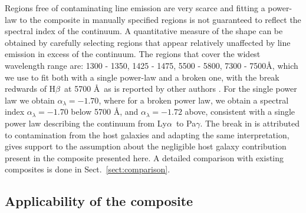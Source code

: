 \documentclass{aa}    %
\newcommand{\sectionname}{Sect.}
\newcommand{\Sect}[1]{\sectionname~\ref{sect:#1}}
\newcommand{\sect}[1]{\Sect{#1}}
\newcommand{\sectlabel}[1]{\label{sect:#1}}
\newcommand{\lya}{Ly$\alpha$}
\newcommand{\hb}{H$\beta$}
\begin{document}
Regions free of contaminating line emission are very scarce and fitting a power-law to the composite in manually specified regions is not guaranteed to reflect the spectral index of the continuum. A quantitative measure of the shape can be obtained by carefully selecting regions that appear relatively unaffected by line emission in excess of the continuum. The regions that cover the widest wavelength range are: 1300 - 1350, 1425 - 1475, 5500 - 5800, 7300 - 7500\AA, which we use to fit both with a single power-law and a broken one, with the break redwards of \hb~at 5700 \AA~as is reported by other authors \citep[e.g.,][]{VandenBerk2001}. For the single power law we obtain $\alpha_\lambda = -1.70$, where for a broken power law, we obtain a spectral index $\alpha_\lambda = -1.70$ below 5700 \AA, and $\alpha_\lambda = -1.72$ above, consistent with a single power law describing the continuum from  \lya ~to Pa$\gamma$. The break in \cite{VandenBerk2001} is attributed to contamination from the host galaxies \citep{Glikman2006} and adapting the same interpretation, gives support to the assumption about the negligible host galaxy contribution present in the composite presented here. A detailed comparison with existing composites is done in \sect{comparison}.


\subsection{Applicability of the composite}  \sectlabel{application}
\end{document}
